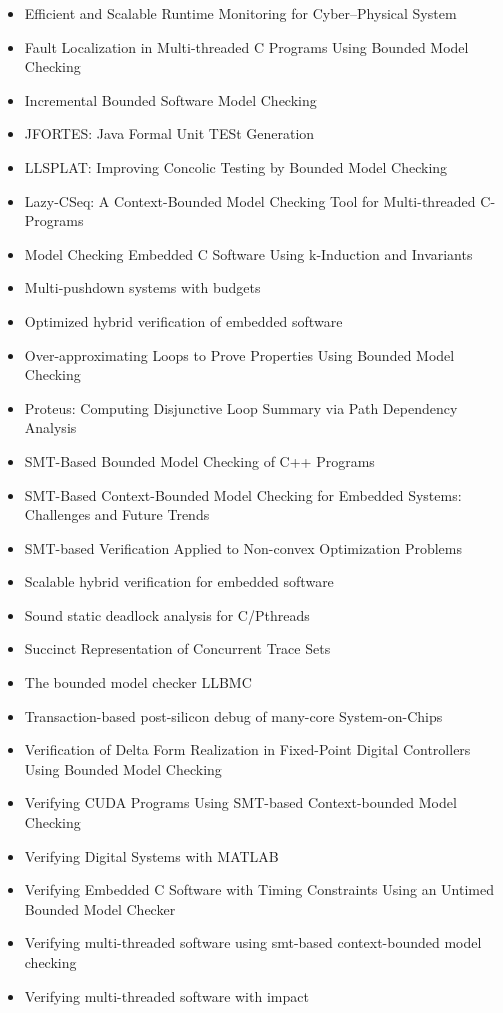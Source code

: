 \begin{itemize}
\item Efficient and Scalable Runtime Monitoring for Cyber--Physical System
\item Fault Localization in Multi-threaded C Programs Using Bounded Model Checking
\item Incremental Bounded Software Model Checking
\item JFORTES: Java Formal Unit TESt Generation
\item LLSPLAT: Improving Concolic Testing by Bounded Model Checking
\item Lazy-CSeq: A Context-Bounded Model Checking Tool for Multi-threaded C-Programs
\item Model Checking Embedded C Software Using k-Induction and Invariants
\item Multi-pushdown systems with budgets
\item Optimized hybrid verification of embedded software
\item Over-approximating Loops to Prove Properties Using Bounded Model Checking
\item Proteus: Computing Disjunctive Loop Summary via Path Dependency Analysis
\item SMT-Based Bounded Model Checking of C++ Programs
\item SMT-Based Context-Bounded Model Checking for Embedded Systems: Challenges and Future Trends
\item SMT-based Verification Applied to Non-convex Optimization Problems
\item Scalable hybrid verification for embedded software
\item Sound static deadlock analysis for C/Pthreads
\item Succinct Representation of Concurrent Trace Sets
\item The bounded model checker LLBMC
\item Transaction-based post-silicon debug of many-core System-on-Chips
\item Verification of Delta Form Realization in Fixed-Point Digital Controllers Using Bounded Model Checking
\item Verifying CUDA Programs Using SMT-based Context-bounded Model Checking
\item Verifying Digital Systems with MATLAB
\item Verifying Embedded C Software with Timing Constraints Using an Untimed Bounded Model Checker
\item Verifying multi-threaded software using smt-based context-bounded model checking
\item Verifying multi-threaded software with impact
\end{itemize}


